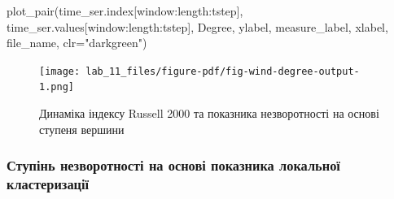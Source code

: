 \documentclass[
  letterpaper,
]{report}
\newenvironment{Shaded}{\begin{snugshade}}{\end{snugshade}}
\newcommand{\CharTok}[1]{\textcolor[rgb]{0.13,0.47,0.30}{#1}}
\newcommand{\NormalTok}[1]{\textcolor[rgb]{0.00,0.23,0.31}{#1}}
\newcommand{\OperatorTok}[1]{\textcolor[rgb]{0.37,0.37,0.37}{#1}}
\newcommand{\SpecialCharTok}[1]{\textcolor[rgb]{0.37,0.37,0.37}{#1}}
\newcommand{\SpecialStringTok}[1]{\textcolor[rgb]{0.13,0.47,0.30}{#1}}
\newcommand{\StringTok}[1]{\textcolor[rgb]{0.13,0.47,0.30}{#1}}
\newcommand{\VerbatimStringTok}[1]{\textcolor[rgb]{0.13,0.47,0.30}{#1}}
\begin{document}
\begin{Shaded}
\begin{Highlighting}[]
\NormalTok{plot\_pair(time\_ser.index[window:length:tstep],}
\NormalTok{          time\_ser.values[window:length:tstep],}
\NormalTok{          Degree, }
\NormalTok{          ylabel, }
\NormalTok{          measure\_label,}
\NormalTok{          xlabel,}
\NormalTok{          file\_name, }
\NormalTok{          clr}\OperatorTok{=}\StringTok{"darkgreen"}\NormalTok{)}
\end{Highlighting}
\end{Shaded}

\begin{figure}[H]

{\centering \texttt{[image: lab\_11\_files/figure-pdf/fig-wind-degree-output-1.png]}

}

\caption{\label{fig-wind-degree}Динаміка індексу Russell 2000 та
показника незворотності на основі ступеня вершини}

\end{figure}

\hypertarget{ux441ux442ux443ux43fux456ux43dux44c-ux43dux435ux437ux432ux43eux440ux43eux442ux43dux43eux441ux442ux456-ux43dux430-ux43eux441ux43dux43eux432ux456-ux43fux43eux43aux430ux437ux43dux438ux43aux430-ux43bux43eux43aux430ux43bux44cux43dux43eux457-ux43aux43bux430ux441ux442ux435ux440ux438ux437ux430ux446ux456ux457}{%
\subsubsection{Ступінь незворотності на основі показника локальної
кластеризації}\label{ux441ux442ux443ux43fux456ux43dux44c-ux43dux435ux437ux432ux43eux440ux43eux442ux43dux43eux441ux442ux456-ux43dux430-ux43eux441ux43dux43eux432ux456-ux43fux43eux43aux430ux437ux43dux438ux43aux430-ux43bux43eux43aux430ux43bux44cux43dux43eux457-ux43aux43bux430ux441ux442ux435ux440ux438ux437ux430ux446ux456ux457}}

\begin{Shaded}
\end{Shaded}
\end{document}
